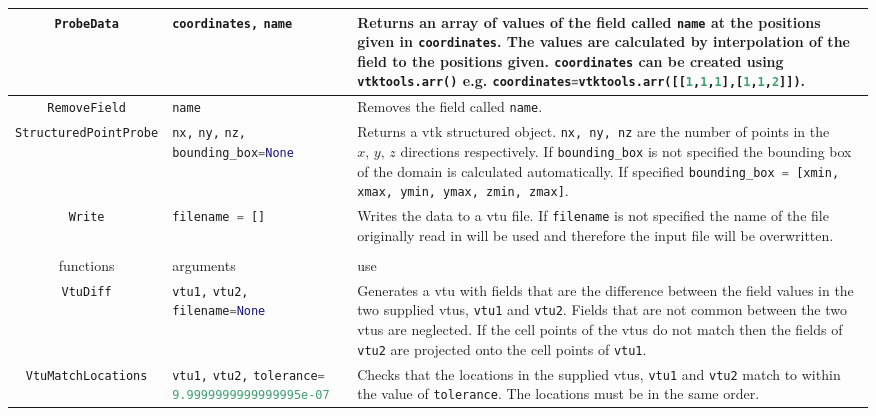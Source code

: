 \begin{landscape}
\begin{longtable}{|c | p{} |p{}|}
%
\lstinline[language=Python]+ProbeData+ & \lstinline[language=Python]+coordinates,+ \lstinline[language=Python]+name+ & Returns an array of values of the field called \lstinline[language=Python]+name+ at the positions given in \lstinline[language=Python]+coordinates+. The values are calculated by interpolation of the field to the positions given. \lstinline[language=Python]+coordinates+ can be created using \lstinline[language=Python]+vtktools.arr()+ e.g. \lstinline[language=Python]+coordinates=vtktools.arr([[1,1,1],[1,1,2]])+. \\ \hline
%
\lstinline[language=Python]+RemoveField+ & \lstinline[language=Python]+name+ & Removes the field called \lstinline[language=Python]+name+. \\ \hline
%
\lstinline[language=Python]+StructuredPointProbe+ & \lstinline[language=Python]+nx,+ \lstinline[language=Python]+ny,+ \lstinline[language=Python]+nz,+ \lstinline[language=Python]+bounding_box=None+ & Returns a vtk structured object. \lstinline[language=Python]+nx, ny, nz+ are the number of points in the $x,\, y, \, z$ directions respectively. If \lstinline[language=Python]+bounding_box+ is not specified the bounding box of the domain is calculated automatically. If specified \lstinline[language=Python]+bounding_box = [xmin, xmax, ymin, ymax, zmin, zmax]+. \\ \hline
%
\lstinline[language=Python]+Write+ & \lstinline[language=Python]+filename = []+ & Writes the data to a vtu file. If \lstinline[language=Python]+filename+ is not specified the name of the file originally read in will be used and therefore the input file will be overwritten. \\ \hline
%
%
%
 &  & \\ \hline
  functions & arguments & use \\ \hline
%
\lstinline[language=Python]+VtuDiff+ & \lstinline[language=Python]+vtu1,+ \lstinline[language=Python]+vtu2,+ \lstinline[language=Python]+filename=None+ & Generates a vtu with fields that are the difference between the field values in the two supplied vtus, \lstinline[language=Python]+vtu1+ and \lstinline[language=Python]+vtu2+. Fields that are not common between the two vtus are neglected. If the cell points of the vtus do not match then the fields of \lstinline[language=Python]+vtu2+ are projected onto the cell points of \lstinline[language=Python]+vtu1+. \\ \hline
%
\lstinline[language=Python]+VtuMatchLocations+ & \lstinline[language=Python]+vtu1,+ \lstinline[language=Python]+vtu2,+ \lstinline[language=Python]+tolerance=+ \lstinline[language=Python]+9.9999999999999995e-07+ & Checks that the locations in the supplied vtus, \lstinline[language=Python]+vtu1+ and \lstinline[language=Python]+vtu2+ match to within the value of \lstinline[language=Python]+tolerance+. The locations must be in the same order. \\ \hline

\end{longtable}
\end{landscape}
